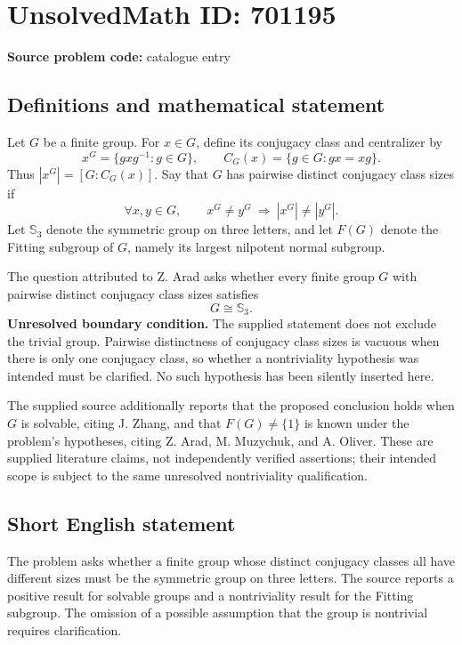 \documentclass[11pt]{article}
\begin{document}
\section*{UnsolvedMath ID: 701195}
\textbf{Source problem code:} catalogue entry
\subsection{Definitions and mathematical statement}
Let \(G\) be a finite group. For \(x\in G\), define its conjugacy class and centralizer by
\[
x^G=\{gxg^{-1}:g\in G\},\qquad C_G(x)=\{g\in G:gx=xg\}.
\]
Thus \(|x^G|=[G:C_G(x)]\). Say that \(G\) has pairwise distinct conjugacy class sizes if
\[
\forall x,y\in G,\qquad x^G\ne y^G\ \Longrightarrow\ |x^G|\ne |y^G|.
\]
Let \(\mathbb S_3\) denote the symmetric group on three letters, and let \(F(G)\) denote the Fitting subgroup of \(G\), namely its largest nilpotent normal subgroup.

The question attributed to Z. Arad asks whether every finite group \(G\) with pairwise distinct conjugacy class sizes satisfies
\[
G\cong\mathbb S_3.
\]
\textbf{Unresolved boundary condition.} The supplied statement does not exclude the trivial group. Pairwise distinctness of conjugacy class sizes is vacuous when there is only one conjugacy class, so whether a nontriviality hypothesis was intended must be clarified. No such hypothesis has been silently inserted here.

The supplied source additionally reports that the proposed conclusion holds when \(G\) is solvable, citing J. Zhang, and that \(F(G)\ne\{1\}\) is known under the problem's hypotheses, citing Z. Arad, M. Muzychuk, and A. Oliver. These are supplied literature claims, not independently verified assertions; their intended scope is subject to the same unresolved nontriviality qualification.
\subsection{Short English statement}
The problem asks whether a finite group whose distinct conjugacy classes all have different sizes must be the symmetric group on three letters. The source reports a positive result for solvable groups and a nontriviality result for the Fitting subgroup. The omission of a possible assumption that the group is nontrivial requires clarification.
\end{document}
